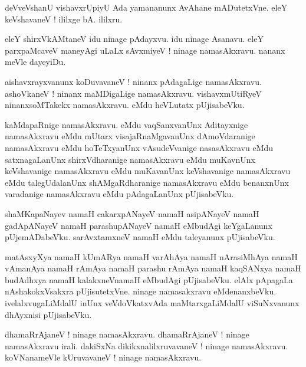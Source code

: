 \documentclass{article}
\begin{document}
\begin{mn}%
deVveVshanU vishavxrUpiyU Ada yamananunx AvAhane mADutetxVne. eleY keVshavaneV ! ililxge bA. ililxru.
\end{mn}

\begin{mn}%
eleY shirxVkAMtaneV idu ninage pAdayxvu. idu ninage Asanavu. eleY parxpaMcaveV maneyAgi uLaLx 
sAvxmiyeV ! ninage namasAkxravu. nananx meVle dayeyiDu.
\end{mn}

\begin{mn}%
aishavxrayxvanunx koDuvavaneV ! ninanx pAdagaLige namasAkxravu. ashoVkaneV ! ninanx maMDigaLige 
namasAkxravu. vishavxmUtiRyeV ninanxsoMTakekx namasAkxravu. eMdu heVLutatx pUjisabeVku.
\end{mn}

\begin{mn}%
kaMdapaRnige namasAkxravu. eMdu vaqSanxvanUnx Aditayxnige namasAkxravu eMdu mUtarx 
visajaRnaMgavanUnx dAmoVdaranige namasAkxravu eMdu hoTeTxyanUnx vAsudeVvanige nasasAkxravu eMdu 
satxnagaLanUnx shirxVdharanige namasAkxravu eMdu muKavnUnx keVshavanige namasAkxravu eMdu 
muKavanUnx keVshavanige namasAkxravu eMdu talegUdalanUnx shAMgaRdharanige namasAkxravu eMdu 
benanxnUnx varadanige namasAkxravu eMdu pAdagaLanUnx pUjisabeVku.
\end{mn}

\begin{mn}%
shaMKapaNayev namaH cakarxpANayeV namaH asipANayeV namaH gadApANayeV namaH parashupANayeV namaH 
eMbudAgi keYgaLanunx pUjemADabeVku. sarAvxtamxneV namaH eMdu taleyanunx pUjisabeVku.
\end{mn}

\begin{mn}%
matAsxyXya namaH kUmARya namaH varAhAya namaH nArasiMhAya namaH vAmanAya namaH rAmAya namaH parashu 
rAmAya namaH kaqSANxya namaH budAdhxya namaH kalakxneVnamaH eMbudAgi pUjisabeVku. elAlx pApagaLa 
nAshakokxVsakxra pUjisutetxVne. ninage namasakxravu eMdenanxbeVku. ivelalxvugaLiMdalU inUnx 
veVdoVkatxvAda maMtarxgaLiMdalU viSuNxvanunx dhAyxnisi pUjisabeVku.
\end{mn}

\begin{mn}%
dhamaRrAjaneV ! ninage namasAkxravu. dhamaRrAjaneV ! ninage namasAkxravu irali. dakiSxNa 
dikikxnalilxruvavaneV ! ninage namasAkxravu. koVNanameVle kUruvavaneV ! ninage namasAkxravu.
\end{mn}
\end{document}
